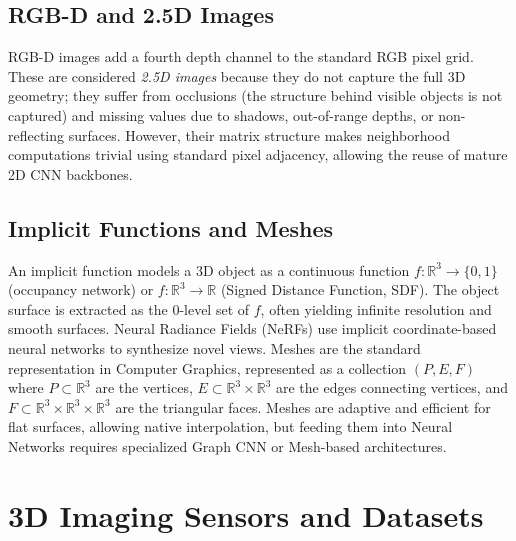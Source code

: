 \subsection{RGB-D and 2.5D Images}
RGB-D images add a fourth depth channel to the standard RGB pixel grid. These are considered \textit{2.5D images} because they do not capture the full 3D geometry; they suffer from occlusions (the structure behind visible objects is not captured) and missing values due to shadows, out-of-range depths, or non-reflecting surfaces. However, their matrix structure makes neighborhood computations trivial using standard pixel adjacency, allowing the reuse of mature 2D CNN backbones.

\subsection{Implicit Functions and Meshes}
An implicit function models a 3D object as a continuous function $f: \mathbb{R}^3 \rightarrow \{0,1\}$ (occupancy network) or $f: \mathbb{R}^3 \rightarrow \mathbb{R}$ (Signed Distance Function, SDF). The object surface is extracted as the 0-level set of $f$, often yielding infinite resolution and smooth surfaces. Neural Radiance Fields (NeRFs) use implicit coordinate-based neural networks to synthesize novel views.
Meshes are the standard representation in Computer Graphics, represented as a collection $(P, E, F)$ where $P \subset \mathbb{R}^3$ are the vertices, $E \subset \mathbb{R}^3 \times \mathbb{R}^3$ are the edges connecting vertices, and $F \subset \mathbb{R}^3 \times \mathbb{R}^3 \times \mathbb{R}^3$ are the triangular faces. Meshes are adaptive and efficient for flat surfaces, allowing native interpolation, but feeding them into Neural Networks requires specialized Graph CNN or Mesh-based architectures.

\section{3D Imaging Sensors and Datasets}

